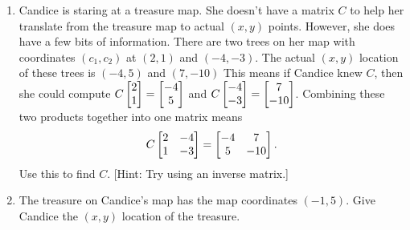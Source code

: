 \begin{problem}
\begin{enumerate}
 
  \item 
 Candice is staring at a treasure map.  She doesn't have a matrix $C$ to help her translate from the treasure map to actual $(x,y)$ points. However, she does have a few bits of information. There are two trees on her map with coordinates $(c_1,c_2)$ at $(2,1)$ and $(-4,-3)$. The actual $(x,y)$ location of these trees is $(-4,5)$ and $(7,-10)$  This means if Candice knew $C$, then she could compute $C\begin{bmatrix} \begin{matrix} 2\\1 \end{matrix} \end{bmatrix}=\begin{bmatrix} \begin{matrix} -4\\5 \end{matrix} \end{bmatrix}$ and $C\begin{bmatrix} \begin{matrix} -4\\-3 \end{matrix} \end{bmatrix}=\begin{bmatrix} \begin{matrix} 7\\-10 \end{matrix} \end{bmatrix}$.  Combining these two products together into one matrix means $$C\begin{bmatrix} \begin{matrix} 2\\1 \end{matrix}&\begin{matrix} -4\\-3 \end{matrix} \end{bmatrix}=\begin{bmatrix} \begin{matrix} -4\\5 \end{matrix}&\begin{matrix} 7\\-10 \end{matrix} \end{bmatrix}.$$  Use this to find $C$.  [Hint: Try using an inverse matrix.]
 \item The treasure on Candice's map has the map coordinates $(-1,5)$.  Give Candice the $(x,y)$ location of the treasure.   
 \end{enumerate}

\end{problem}



















